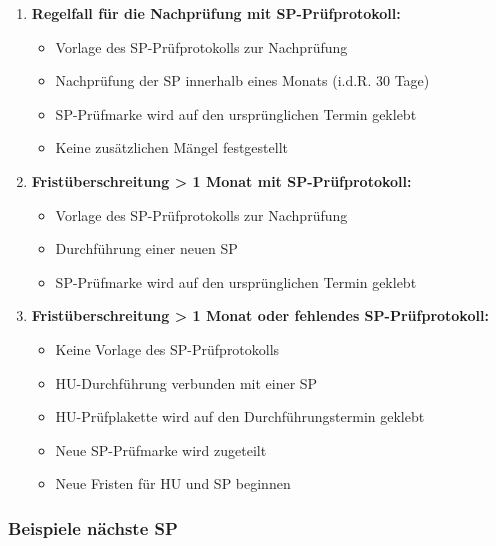 \documentclass{vorlage-design-main}
\begin{document}
\begin{enumerate}
\def\labelenumi{\arabic{enumi}.}

\item
  \textbf{Regelfall für die Nachprüfung mit SP-Prüfprotokoll:}

  \begin{itemize}

  \item
    Vorlage des SP-Prüfprotokolls zur Nachprüfung
  \item
    Nachprüfung der SP innerhalb eines Monats (i.d.R. 30 Tage)
  \item
    SP-Prüfmarke wird auf den ursprünglichen Termin geklebt
  \item
    Keine zusätzlichen Mängel festgestellt
  \end{itemize}
\item
  \textbf{Fristüberschreitung \textgreater{} 1 Monat mit
  SP-Prüfprotokoll:}

  \begin{itemize}

  \item
    Vorlage des SP-Prüfprotokolls zur Nachprüfung
  \item
    Durchführung einer neuen SP
  \item
    SP-Prüfmarke wird auf den ursprünglichen Termin geklebt
  \end{itemize}
\item
  \textbf{Fristüberschreitung \textgreater{} 1 Monat oder fehlendes
  SP-Prüfprotokoll:}

  \begin{itemize}

  \item
    Keine Vorlage des SP-Prüfprotokolls
  \item
    HU-Durchführung verbunden mit einer SP
  \item
    HU-Prüfplakette wird auf den Durchführungstermin geklebt
  \item
    Neue SP-Prüfmarke wird zugeteilt
  \item
    Neue Fristen für HU und SP beginnen
  \end{itemize}
\end{enumerate}

\subsubsection{Beispiele nächste SP}\label{beispiele-naechste-sp}
\end{document}

